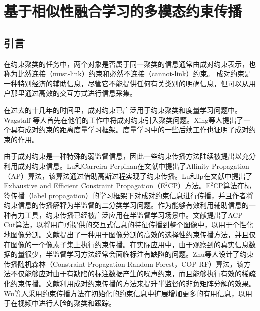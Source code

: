 \chapter{基于相似性融合学习的多模态约束传播}
\section{引言}
\label{sec3:intro} 
在约束聚类的任务中，两个对象是否属于同一聚类的信息通常由成对约束表示，也称为比然连接（must-link）约束和必然不连接（cannot-link）约束。 成对约束是一种特别经济的辅助信息，尽管它不能提供任何有关类别的明确信息，但可以从用户那里通过高效的交互方式进行信息采集。

在过去的十几年的时间里，成对约束已广泛用于约束聚类和度量学习问题中。Wagstaff 等人首先在他们的工作中将成对约束引入聚类问题\cite{wagstaff2000clustering,wagstaff2001constrained}。Xing等人提出了一个具有成对约束的距离度量学习框架\cite{xing2002distance}。度量学习中的一些后续工作也证明了成对约束的作用\cite{weinberger2005distance,davis2007information}。

由于成对约束是一种特殊的弱监督信息，因此一些约束传播方法\cite{lu2008constrained,lu2010constrained,fu2011symmetric}陆续被提出以充分利用成对约束信息。Lu和Carreira-Perpinan在文献\parencite{lu2008constrained}中提出了Affinity Propagation（AP）算法，该算法通过借助高斯过程实现了约束传播。Lu和Ip在文献\parencite{lu2010constrained}中提出了Exhaustive and Efficient Constraint Propagation（E$^2$CP）方法。E$^2$CP算法在标签传播（label propagation）\cite{zhou2004learning}的学习框架下对成对约束信息进行传播，并且作者将约束信息的传播解释为半监督的二分类学习问题。作为能够有效利用辅助信息的一种有力工具，约束传播已经被广泛应用在半监督学习场景中。文献\parencite{jian2016interactive}提出了ACP Cut算法，以将用户所提供的交互式信息的特征传播到整个图像中，以用于个性化地图像分割。文献\parencite{han2016segmentation}提出了一种用于图像分割的高效的选择性约束传播方法，并且仅在图像的一个像素子集上执行约束传播。在实际应用中，由于观察到的真实信息数据的量很少，半监督学习方法经常会面临标注有缺陷的问题。Zhu等人设计了约束传播随机森林（Constraint Propagation Random Forest，COP-RF）算法\cite {zhu2016constrained}，该方法不仅能够应对由于有缺陷的标注数据产生的噪声约束，而且能够执行有效的稀疏化约束传播。文献\parencite{wang2016semi}利用成对约束传播的方法来提升半监督的非负矩阵分解的效果。Wu等人采用约束传播方法在初始化的约束信息中扩展增加更多的有用信息，以用于在视频中进行人脸的聚类和跟踪\cite{wu2017coupled}。

